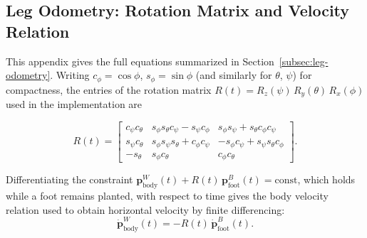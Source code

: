 \documentclass[12pt]{article}
\begin{document}
\subsection{Leg Odometry: Rotation Matrix and Velocity Relation}
\label{app:leg-odom-eqs}
This appendix gives the full equations summarized in Section~\ref{subsec:leg-odometry}. Writing $c_\phi = \cos\phi$, $s_\phi = \sin\phi$ (and similarly for $\theta$, $\psi$) for compactness, the entries of the rotation matrix $R(t) = R_z(\psi)\,R_y(\theta)\,R_x(\phi)$ used in the implementation are

\begin{equation}
R(t) =
\begin{bmatrix}
c_\psi c_\theta & s_\phi s_\theta c_\psi - s_\psi c_\phi & s_\phi s_\psi + s_\theta c_\phi c_\psi \\
s_\psi c_\theta & s_\phi s_\psi s_\theta + c_\phi c_\psi & -s_\phi c_\psi + s_\psi s_\theta c_\phi \\
-s_\theta & s_\phi c_\theta & c_\phi c_\theta
\end{bmatrix}.
\label{eq:rotation-matrix}
\end{equation}

Differentiating the constraint $\mathbf{p}^{W}_{\text{body}}(t) + R(t)\,\mathbf{p}^{B}_{\text{foot}}(t) = \text{const}$, which holds while a foot remains planted, with respect to time gives the body velocity relation used to obtain horizontal velocity by finite differencing:
\begin{equation}
\dot{\mathbf{p}}^{W}_{\text{body}}(t) = -R(t)\,\dot{\mathbf{p}}^{B}_{\text{foot}}(t).
\end{equation}
\end{document}
